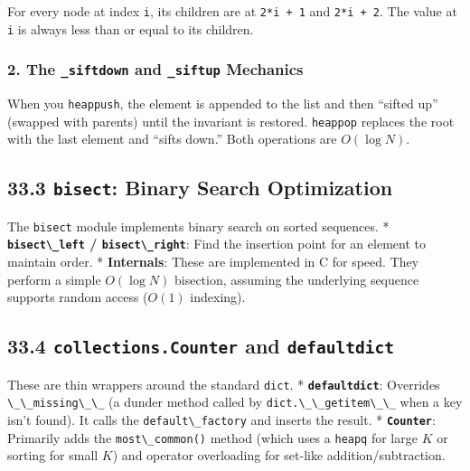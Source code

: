 For every node at index \passthrough{\lstinline!i!}, its children are at
\passthrough{\lstinline!2*i + 1!} and \passthrough{\lstinline!2*i + 2!}.
The value at \passthrough{\lstinline!i!} is always less than or equal to
its children.

\hypertarget{the-_siftdown-and-_siftup-mechanics}{%
\subsubsection{\texorpdfstring{2. The \texttt{\_siftdown} and
\texttt{\_siftup}
Mechanics}{2. The \_siftdown and \_siftup Mechanics}}\label{the-_siftdown-and-_siftup-mechanics}}

When you \passthrough{\lstinline!heappush!}, the element is appended to
the list and then ``sifted up'' (swapped with parents) until the
invariant is restored. \passthrough{\lstinline!heappop!} replaces the
root with the last element and ``sifts down.'' Both operations are
\(O(\log N)\).

\hypertarget{bisect-binary-search-optimization}{%
\subsection{\texorpdfstring{33.3 \texttt{bisect}: Binary Search
Optimization}{33.3 bisect: Binary Search Optimization}}\label{bisect-binary-search-optimization}}

The \passthrough{\lstinline!bisect!} module implements binary search on
sorted sequences. * \textbf{\passthrough{\lstinline!bisect\_left!} /
\passthrough{\lstinline!bisect\_right!}}: Find the insertion point for
an element to maintain order. * \textbf{Internals}: These are
implemented in C for speed. They perform a simple \(O(\log N)\)
bisection, assuming the underlying sequence supports random access
(\(O(1)\) indexing).

\hypertarget{collections.counter-and-defaultdict}{%
\subsection{\texorpdfstring{33.4 \texttt{collections.Counter} and
\texttt{defaultdict}}{33.4 collections.Counter and defaultdict}}\label{collections.counter-and-defaultdict}}

These are thin wrappers around the standard
\passthrough{\lstinline!dict!}. *
\textbf{\passthrough{\lstinline!defaultdict!}}: Overrides
\passthrough{\lstinline!\_\_missing\_\_!} (a dunder method called by
\passthrough{\lstinline!dict.\_\_getitem\_\_!} when a key isn't found).
It calls the \passthrough{\lstinline!default\_factory!} and inserts the
result. * \textbf{\passthrough{\lstinline!Counter!}}: Primarily adds the
\passthrough{\lstinline!most\_common()!} method (which uses a
\passthrough{\lstinline!heapq!} for large \(K\) or sorting for small
\(K\)) and operator overloading for set-like addition/subtraction.

